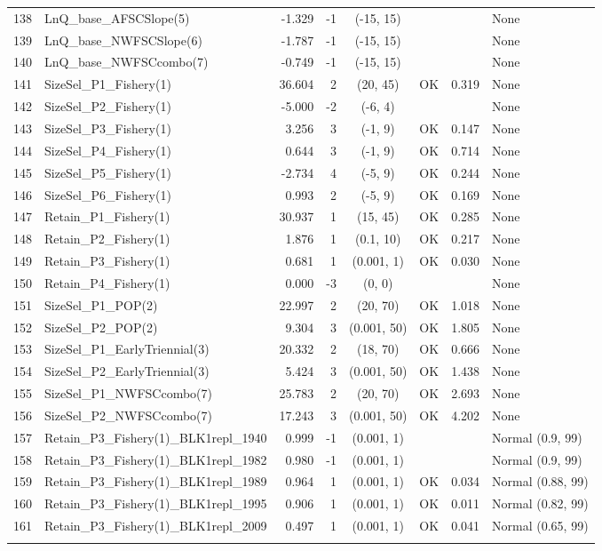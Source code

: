 \documentclass[12pt,]{article}
\begin{document}
\begin{landscape}
\begin{longtable}{rlrrcccl}
  138 & LnQ\_base\_AFSCSlope(5) & -1.329 & -1 & (-15, 15) &  &  & None \\ 
  139 & LnQ\_base\_NWFSCSlope(6) & -1.787 & -1 & (-15, 15) &  &  & None \\ 
  140 & LnQ\_base\_NWFSCcombo(7) & -0.749 & -1 & (-15, 15) &  &  & None \\ 
  141 & SizeSel\_P1\_Fishery(1) & 36.604 & 2 & (20, 45) & OK & 0.319 & None \\ 
  142 & SizeSel\_P2\_Fishery(1) & -5.000 & -2 & (-6, 4) &  &  & None \\ 
  143 & SizeSel\_P3\_Fishery(1) & 3.256 & 3 & (-1, 9) & OK & 0.147 & None \\ 
  144 & SizeSel\_P4\_Fishery(1) & 0.644 & 3 & (-1, 9) & OK & 0.714 & None \\ 
  145 & SizeSel\_P5\_Fishery(1) & -2.734 & 4 & (-5, 9) & OK & 0.244 & None \\ 
  146 & SizeSel\_P6\_Fishery(1) & 0.993 & 2 & (-5, 9) & OK & 0.169 & None \\ 
  147 & Retain\_P1\_Fishery(1) & 30.937 & 1 & (15, 45) & OK & 0.285 & None \\ 
  148 & Retain\_P2\_Fishery(1) & 1.876 & 1 & (0.1, 10) & OK & 0.217 & None \\ 
  149 & Retain\_P3\_Fishery(1) & 0.681 & 1 & (0.001, 1) & OK & 0.030 & None \\ 
  150 & Retain\_P4\_Fishery(1) & 0.000 & -3 & (0, 0) &  &  & None \\ 
  151 & SizeSel\_P1\_POP(2) & 22.997 & 2 & (20, 70) & OK & 1.018 & None \\ 
  152 & SizeSel\_P2\_POP(2) & 9.304 & 3 & (0.001, 50) & OK & 1.805 & None \\ 
  153 & SizeSel\_P1\_EarlyTriennial(3) & 20.332 & 2 & (18, 70) & OK & 0.666 & None \\ 
  154 & SizeSel\_P2\_EarlyTriennial(3) & 5.424 & 3 & (0.001, 50) & OK & 1.438 & None \\ 
  155 & SizeSel\_P1\_NWFSCcombo(7) & 25.783 & 2 & (20, 70) & OK & 2.693 & None \\ 
  156 & SizeSel\_P2\_NWFSCcombo(7) & 17.243 & 3 & (0.001, 50) & OK & 4.202 & None \\ 
  157 & Retain\_P3\_Fishery(1)\_BLK1repl\_1940 & 0.999 & -1 & (0.001, 1) &  &  & Normal (0.9, 99) \\ 
  158 & Retain\_P3\_Fishery(1)\_BLK1repl\_1982 & 0.980 & -1 & (0.001, 1) &  &  & Normal (0.9, 99) \\ 
  159 & Retain\_P3\_Fishery(1)\_BLK1repl\_1989 & 0.964 & 1 & (0.001, 1) & OK & 0.034 & Normal (0.88, 99) \\ 
  160 & Retain\_P3\_Fishery(1)\_BLK1repl\_1995 & 0.906 & 1 & (0.001, 1) & OK & 0.011 & Normal (0.82, 99) \\ 
  161 & Retain\_P3\_Fishery(1)\_BLK1repl\_2009 & 0.497 & 1 & (0.001, 1) & OK & 0.041 & Normal (0.65, 99) \\ 
   \hline
\hline
\label{tab:model_params}
\end{longtable}
\end{landscape}
\end{document}
